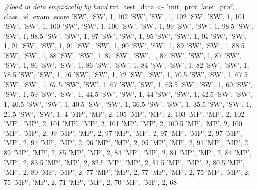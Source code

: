 \documentclass[
]{article}
\newenvironment{Shaded}{\begin{snugshade}}{\end{snugshade}}
\newcommand{\CommentTok}[1]{\textcolor[rgb]{0.56,0.35,0.01}{\textit{#1}}}
\newcommand{\NormalTok}[1]{#1}
\newcommand{\StringTok}[1]{\textcolor[rgb]{0.31,0.60,0.02}{#1}}
\begin{document}
\begin{Shaded}
\begin{Highlighting}[]
\CommentTok{#load in data empirically by hand}
\NormalTok{txt_test_data <-}\StringTok{ "init_prof, later_prof, class_id, exam_score}
\StringTok{ 'SW', 'SW', 1, 102}
\StringTok{ 'SW', 'SW', 1, 102}
\StringTok{ 'SW', 'SW', 1, 101}
\StringTok{ 'SW', 'SW', 1, 100}
\StringTok{ 'SW', 'SW', 1, 100}
\StringTok{ 'SW', 'SW', 1, 99}
\StringTok{ 'SW', 'SW', 1, 98.5}
\StringTok{ 'SW', 'SW', 1, 98.5}
\StringTok{ 'SW', 'SW', 1, 97}
\StringTok{ 'SW', 'SW', 1, 95}
\StringTok{ 'SW', 'SW', 1, 94}
\StringTok{ 'SW', 'SW', 1, 91}
\StringTok{ 'SW', 'SW', 1, 91}
\StringTok{ 'SW', 'SW', 1, 90}
\StringTok{ 'SW', 'SW', 1, 89}
\StringTok{ 'SW', 'SW', 1, 88.5}
\StringTok{ 'SW', 'SW', 1, 88}
\StringTok{ 'SW', 'SW', 1, 87}
\StringTok{ 'SW', 'SW', 1, 87}
\StringTok{ 'SW', 'SW', 1, 87}
\StringTok{ 'SW', 'SW', 1, 86}
\StringTok{ 'SW', 'SW', 1, 86}
\StringTok{ 'SW', 'SW', 1, 84}
\StringTok{ 'SW', 'SW', 1, 82}
\StringTok{ 'SW', 'SW', 1, 78.5}
\StringTok{ 'SW', 'SW', 1, 76}
\StringTok{ 'SW', 'SW', 1, 72}
\StringTok{ 'SW', 'SW', 1, 70.5}
\StringTok{ 'SW', 'SW', 1, 67.5}
\StringTok{ 'SW', 'SW', 1, 67.5}
\StringTok{ 'SW', 'SW', 1, 67}
\StringTok{ 'SW', 'SW', 1, 63.5}
\StringTok{ 'SW', 'SW', 1, 60}
\StringTok{ 'SW', 'SW', 1, 59}
\StringTok{ 'SW', 'SW', 1, 44.5}
\StringTok{ 'SW', 'SW', 1, 44}
\StringTok{ 'SW', 'SW', 1, 42.5}
\StringTok{ 'SW', 'SW', 1, 40.5}
\StringTok{ 'SW', 'SW', 1, 40.5}
\StringTok{ 'SW', 'SW', 1, 36.5}
\StringTok{ 'SW', 'SW', 1, 35.5}
\StringTok{ 'SW', 'SW', 1, 21.5}
\StringTok{ 'SW', 'SW', 1, 4}
\StringTok{ 'MP', 'MP', 2, 105}
\StringTok{ 'MP', 'MP', 2, 103}
\StringTok{ 'MP', 'MP', 2, 102}
\StringTok{ 'MP', 'MP', 2, 101}
\StringTok{ 'MP', 'MP', 2, 101}
\StringTok{ 'MP', 'MP', 2, 100.5}
\StringTok{ 'MP', 'MP', 2, 100}
\StringTok{ 'MP', 'MP', 2, 99}
\StringTok{ 'MP', 'MP', 2, 97}
\StringTok{ 'MP', 'MP', 2, 97}
\StringTok{ 'MP', 'MP', 2, 97}
\StringTok{ 'MP', 'MP', 2, 97}
\StringTok{ 'MP', 'MP', 2, 96}
\StringTok{ 'MP', 'MP', 2, 95}
\StringTok{ 'MP', 'MP', 2, 91}
\StringTok{ 'MP', 'MP', 2, 89}
\StringTok{ 'MP', 'MP', 2, 85}
\StringTok{ 'MP', 'MP', 2, 84}
\StringTok{ 'MP', 'MP', 2, 84}
\StringTok{ 'MP', 'MP', 2, 84}
\StringTok{ 'MP', 'MP', 2, 83.5}
\StringTok{ 'MP', 'MP', 2, 82.5}
\StringTok{ 'MP', 'MP', 2, 81.5}
\StringTok{ 'MP', 'MP', 2, 80.5}
\StringTok{ 'MP', 'MP', 2, 80}
\StringTok{ 'MP', 'MP', 2, 77}
\StringTok{ 'MP', 'MP', 2, 77}
\StringTok{ 'MP', 'MP', 2, 75}
\StringTok{ 'MP', 'MP', 2, 75}
\StringTok{ 'MP', 'MP', 2, 71}
\StringTok{ 'MP', 'MP', 2, 70}
\StringTok{ 'MP', 'MP', 2, 68}

\end{Highlighting}
\end{Shaded}
\end{document}
